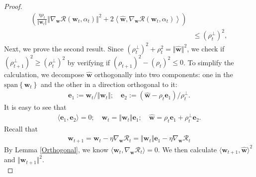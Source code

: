 \documentclass[pdflatex,sn-basic]{sn-jnl}%
\theoremstyle{thmstyleone}%
\begin{document}
\begin{appendices}
\begin{proof}
\begin{equation*}
\begin{aligned}
    \left(
      \frac{\eta {\rho}_{t}}{\Vert \mathbf{w}_{t} \Vert}
      \left\Vert
        \nabla_{\mathbf{w}} \mathcal{R} \left(\mathbf{w}_t, \alpha_t\right)
      \right\Vert^2
      +
      2
      \left\langle 
      \hat{\mathbf{w}},
      \nabla_{\mathbf{w}} \mathcal{R} \left(\mathbf{w}_t, \alpha_t\right)
      \right\rangle
    \right)
    \\ & \le 
    \left(
      {\rho}_{t}^{\perp}
    \right)^2,
  \end{aligned}
  \end{equation*}
  Next, we prove the second result. 
  Since $\left({\rho}_{t}^{\perp}\right)^2 + {\rho}_{t}^2 = \Vert \hat{\mathbf{w}}\Vert^2$, 
  we check if $\left(
    {\rho}_{t+1}^{\perp}
  \right)^2 \ge \left(
    {\rho}_{t}^{\perp}
  \right)^2$ by verifying if $\left(
    {\rho}_{t+1}
  \right)^2 - \left(
    {\rho}_{t}
  \right)^2 \le 0$.
  To simplify the calculation, we decompose $\hat{\mathbf{w}}$ orthogonally into two components: one in the $\text{span}\left\{\mathbf{w}_t\right\}$ and the other
  in a direction orthogonal to it: 
  \begin{equation*}
  \begin{aligned}
    \mathbf{e}_1 := \mathbf{w}_t / \Vert \mathbf{w}_t \Vert; \quad 
    \mathbf{e}_2 := \left(\hat{\mathbf{w}} - \rho_t \mathbf{e}_1 \right) / \rho_t^{\perp}.
  \end{aligned}
  \end{equation*}
  It is easy to see that
  \begin{equation*}
  \begin{aligned}
     \langle \mathbf{e}_1, \mathbf{e}_2 \rangle = 0; \quad 
     \mathbf{w}_t = \Vert \mathbf{w}_t \Vert \mathbf{e}_1; \quad
    \hat{\mathbf{w}} = \rho_t \mathbf{e}_1 + \rho_t^{\perp} \mathbf{e}_2.
  \end{aligned}
  \end{equation*}
  Recall that 
  \begin{equation*}
  \begin{aligned}
    \mathbf{w}_{t+1} = \mathbf{w}_{t} - \eta 
    \nabla_{\mathbf{w}} \mathcal{R}_t
    = \Vert \mathbf{w}_t \Vert \mathbf{e}_1 - \eta 
    \nabla_{\mathbf{w}} \mathcal{R}_t
  \end{aligned}
  \end{equation*}
  By Lemma \ref{Orthogonal}, we know $\langle \mathbf{w}_t, \nabla_{\mathbf{w}} \mathcal{R}_t \rangle  = 0$.
  We then calculate $\langle \mathbf{w}_{t+1}, \hat{\mathbf{w}} \rangle^2$ and $\Vert \mathbf{w}_{t+1} \Vert^2$. 
  \begin{equation*}

\end{equation*}
\end{proof}
\end{appendices}
\end{document}
